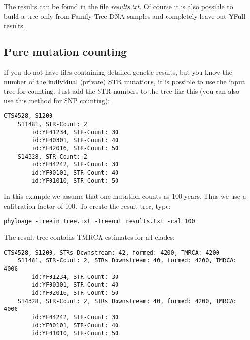 The results can be found in the file \emph{results.txt}.
Of course it is also possible to build a tree only from
Family Tree DNA samples and completely leave out YFull
results.


\subsection{Pure mutation counting}

If you do not have files containing detailed genetic results,
but you know the number of the individual (private) STR
mutations, it is possible to use the input tree for counting.
Just add the STR numbers to the tree like this (you can also
use this method for SNP counting):

\begin{verbatim}
CTS4528, S1200
    S11481, STR-Count: 2
        id:YF01234, STR-Count: 30
        id:YF00301, STR-Count: 40
        id:YF02016, STR-Count: 50
    S14328, STR-Count: 2
        id:YF04242, STR-Count: 30
        id:YF00101, STR-Count: 40
        id:YF01010, STR-Count: 50
\end{verbatim}


In this example we assume that one mutation counts as 100
years. Thus we use a calibration factor of 100. To create
the result tree, type:

\vspace{1ex}\noindent
\texttt{phyloage -treein tree.txt -treeout results.txt -cal 100}
\vspace{1ex}

\noindent
The result tree contains TMRCA estimates for all clades:

\begin{verbatim}
CTS4528, S1200, STRs Downstream: 42, formed: 4200, TMRCA: 4200
    S11481, STR-Count: 2, STRs Downstream: 40, formed: 4200, TMRCA: 4000
        id:YF01234, STR-Count: 30
        id:YF00301, STR-Count: 40
        id:YF02016, STR-Count: 50
    S14328, STR-Count: 2, STRs Downstream: 40, formed: 4200, TMRCA: 4000
        id:YF04242, STR-Count: 30
        id:YF00101, STR-Count: 40
        id:YF01010, STR-Count: 50
\end{verbatim}






